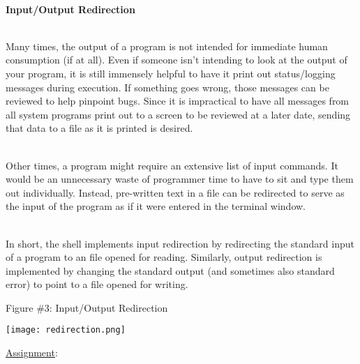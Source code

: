 \documentclass[12pt]{extarticle}
\newenvironment{myindentpar}[1]%
 {\begin{list}{}%
         {\setlength{\leftmargin}{#1}}%
         \item[]%
 }
 {\end{list}}
\begin{document}
\begin{myindentpar}{5mm}

\ \\
\textbf{Input/Output Redirection}

\ \\
Many times, the output of a program is not intended for immediate human consumption (if at all).  Even if someone isn't intending to look at the output of your program, it is still immensely helpful to have it print out status/logging messages during execution.  If something goes wrong, those messages can be reviewed to help pinpoint bugs.  Since it is impractical to have all messages from all system programs print out to a screen to be reviewed at a later date, sending that data to a file as it is printed is desired.  

\ \\
Other times, a program might require an extensive list of input commands.  It would be an unnecessary waste of programmer time to have to sit and type them out individually.  Instead, pre-written text in a file can be redirected to serve as the input of the program as if it were entered in the terminal window.  

\ \\
In short, the shell implements input redirection by redirecting the standard input of a program to an file opened for reading.  Similarly, output redirection is implemented by changing the standard output (and sometimes also standard error) to point to a file opened for writing.  

\begin{center}
    Figure \#3: Input/Output Redirection
\end{center}
\begin{center}
    \texttt{[image: redirection.png]}
\end{center}


\end{myindentpar}


\newpage
\noindent
{\large \underline{Assignment}:}
\end{document}
